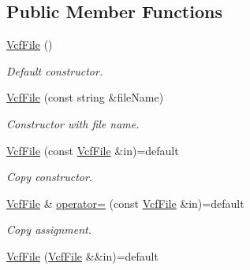 \subsection*{Public Member Functions}
\begin{DoxyCompactItemize}
\item 
\mbox{\label{classsamp_files_1_1_vcf_file_a4f8392c4a221f439295634d26562e72d}} 
\hyperlink{classsamp_files_1_1_vcf_file_a4f8392c4a221f439295634d26562e72d}{Vcf\+File} ()
\begin{DoxyCompactList}\small\item\em Default constructor. \end{DoxyCompactList}\item 
\hyperlink{classsamp_files_1_1_vcf_file_acc4f8659e8bb2a827281b57062267b59}{Vcf\+File} (const string \&file\+Name)
\begin{DoxyCompactList}\small\item\em Constructor with file name. \end{DoxyCompactList}\item 
\mbox{\label{classsamp_files_1_1_vcf_file_a5ec93a433a48851cb15b1901d40b10d9}} 
\hyperlink{classsamp_files_1_1_vcf_file_a5ec93a433a48851cb15b1901d40b10d9}{Vcf\+File} (const \hyperlink{classsamp_files_1_1_vcf_file}{Vcf\+File} \&in)=default
\begin{DoxyCompactList}\small\item\em Copy constructor. \end{DoxyCompactList}\item 
\mbox{\label{classsamp_files_1_1_vcf_file_a003b6d00331e5c795229650091298a4b}} 
\hyperlink{classsamp_files_1_1_vcf_file}{Vcf\+File} \& \hyperlink{classsamp_files_1_1_vcf_file_a003b6d00331e5c795229650091298a4b}{operator=} (const \hyperlink{classsamp_files_1_1_vcf_file}{Vcf\+File} \&in)=default
\begin{DoxyCompactList}\small\item\em Copy assignment. \end{DoxyCompactList}\item 
\mbox{\label{classsamp_files_1_1_vcf_file_abf32945383dfaa36ac6acee8e449b5d9}} 
\hyperlink{classsamp_files_1_1_vcf_file_abf32945383dfaa36ac6acee8e449b5d9}{Vcf\+File} (\hyperlink{classsamp_files_1_1_vcf_file}{Vcf\+File} \&\&in)=default

\end{DoxyCompactItemize}
